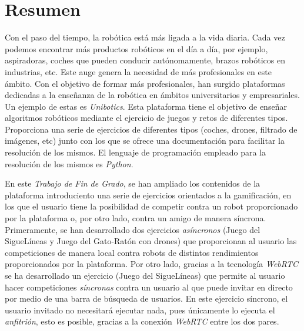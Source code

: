\documentclass[a4paper, 12pt]{book}
\begin{document}

\chapter*{Resumen}


Con el paso del tiempo, la robótica está más ligada a la vida diaria. Cada vez podemos encontrar más productos robóticos en el día a día, por ejemplo, aspiradoras, coches que pueden conducir autónomamente, brazos robóticos en industrias, etc. Este auge genera la necesidad de más profesionales en este ámbito. Con el objetivo de formar más profesionales, han surgido plataformas dedicadas a la enseñanza de la robótica en ámbitos universitarios y empresariales. Un ejemplo de estas es \emph{Unibotics}. Esta plataforma tiene el objetivo de enseñar algoritmos robóticos mediante el ejercicio de juegos y retos de diferentes tipos. Proporciona una serie de ejercicios de diferentes tipos (coches, drones, filtrado de imágenes, etc) junto con los que se ofrece una documentación para facilitar la resolución de los mismos. El lenguaje de programación empleado para la resolución de los mismos es \emph{Python}.

En este \emph{Trabajo de Fin de Grado}, se han ampliado los contenidos de la plataforma introduciento una serie de ejercicios orientados a la gamificación, en los que el usuario tiene la posibilidad de competir contra un robot proporcionado por la plataforma o, por otro lado, contra un amigo de manera síncrona. Primeramente, se han desarrollado dos ejercicios \emph{asíncronos} (Juego del SigueLíneas y Juego del Gato-Ratón con drones) que proporcionan al usuario las competiciones de manera local contra robots de distintos rendimientos proporcionados por la plataforma. Por otro lado, gracias a la tecnología \emph{WebRTC} se ha desarrollado un ejercicio (Juego del SigueLíneas) que permite al usuario hacer competiciones \emph{síncronas} contra un usuario al que puede invitar en directo por medio de una barra de búsqueda de usuarios. En este ejercicio síncrono, el usuario invitado no necesitará ejecutar nada, pues únicamente lo ejecuta el \emph{anfitrión}, esto es posible, gracias a la conexión \emph{WebRTC} entre los dos pares.

\end{document}
